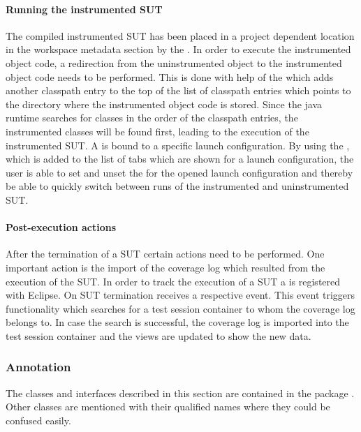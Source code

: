 \paragraph{Running the instrumented SUT}
The compiled instrumented SUT has been placed in a project dependent
location in the workspace metadata section by the
. In order to execute the
instrumented object code, a redirection from the uninstrumented object
to the instrumented object code needs to be performed.
This is done with help of the
 which adds another classpath entry to
the top of the list of classpath entries which points to the directory
where the instrumented object code is stored. Since the java runtime
searches for classes in the order of the classpath entries, the
instrumented classes will be found first, leading to the execution of
the instrumented SUT. A  is bound to a specific
launch configuration. By using the , which is
added to the list of tabs which are shown for a launch configuration,
the user is able to set and unset the 
for the opened launch configuration and thereby be able to quickly
switch between runs of the instrumented and uninstrumented SUT.

\paragraph{Post-execution actions}
After the termination of a SUT certain actions need to be performed.
One important action is the import of the coverage log which
resulted from the execution of the SUT. In order to track the
execution of a SUT a  is registered with
Eclipse. On SUT termination 
receives a respective event. This event triggers functionality
which searches for a test session container to whom the coverage log
belongs to. In case the search is successful, the coverage log is
imported into the test session container and the views are updated
to show the new data.

\subsubsection{Annotation}

The classes and interfaces described in this section are contained in the
package . Other classes are mentioned
with their qualified names where they could be confused easily.

